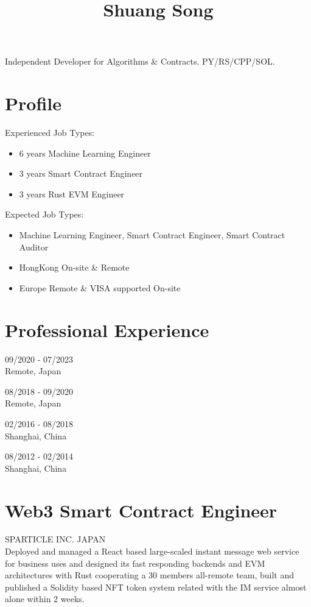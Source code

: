 \documentclass[10pt]{article}
\title{Shuang Song }
\author{}
\date{}
\begin{document}
\maketitle
Independent Developer for Algorithms \& Contracts. PY/RS/CPP/SOL.

\section*{Profile}
Experienced Job Types:

\begin{itemize}
  \item 6 years Machine Learning Engineer
  \item 3 years Smart Contract Engineer
  \item 3 years Rust EVM Engineer
\end{itemize}

Expected Job Types:

\begin{itemize}
  \item Machine Learning Engineer, Smart Contract Engineer, Smart Contract Auditor
  \item HongKong On-site \& Remote
  \item Europe Remote \& VISA supported On-site
\end{itemize}

\section*{Professional Experience}
09/2020 - 07/2023\\
Remote, Japan

08/2018 - 09/2020\\
Remote, Japan

02/2016 - 08/2018\\
Shanghai, China

08/2012 - 02/2014\\
Shanghai, China

\section*{Web3 Smart Contract Engineer}
SPARTICLE INC. JAPAN\\
Deployed and managed a React based large-scaled instant message web service for business uses and designed its fast responding backends and EVM architectures with Rust cooperating a 30 members all-remote team, built and published a Solidity based NFT token system related with the IM service almost alone within 2 weeks.
\end{document}
